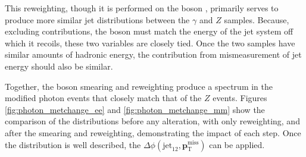 This reweighting, though it is performed on the boson \pt, primarily serves to produce more similar jet distributions between the $\gamma$ and $Z$ samples. Because, excluding \met contributions, the boson \pt must match the energy of the jet system off which it recoils, these two variables are closely tied. Once the two samples have similar amounts of hadronic energy, the \met contribution from mismeasurement of jet energy should also be similar. 

Together, the boson smearing and \pt reweighting produce a \met spectrum in the modified photon events that closely match that of the $Z$ events. Figures \ref{fig:photon_metchange_ee} and \ref{fig:photon_metchange_mm} show the comparison of the \met distributions before any alteration, with only \pt reweighting, and after the smearing and reweighting, demonstrating the impact of each step. Once the \met distribution is well described, the $\Delta\phi(\text{jet}_{12},{\boldsymbol p}_{\mathrm{T}}^\mathrm{miss})$ can be applied. 

